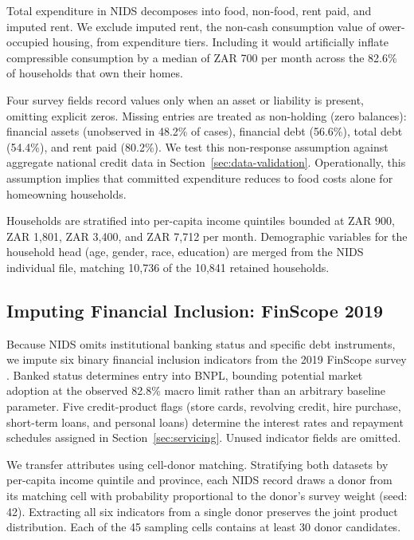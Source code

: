 Total expenditure in \ac{NIDS} decomposes into food, non-food, rent paid, and imputed rent.
We exclude imputed rent, the non-cash consumption value of ower-occupied housing, from expenditure tiers.
Including it would artificially inflate compressible consumption by a median of ZAR 700 per month across the 82.6\% of households that own their homes.

Four survey fields record values only when an asset or liability is present, omitting explicit zeros.
Missing entries are treated as non-holding (zero balances): financial assets (unobserved in 48.2\% of cases), financial debt (56.6\%), total debt (54.4\%), and rent paid (80.2\%).
We test this non-response assumption against aggregate national credit data in Section~\ref{sec:data-validation}.
Operationally, this assumption implies that committed expenditure reduces to food costs alone for homeowning households.

Households are stratified into per-capita income quintiles bounded at ZAR 900, ZAR 1{,}801, ZAR 3{,}400, and ZAR 7{,}712 per month.
Demographic variables for the household head (age, gender, race, education) are merged from the \ac{NIDS} individual file, matching 10{,}736 of the 10{,}841 retained households.

\subsection{Imputing Financial Inclusion: FinScope 2019}
\label{sec:match}

Because \ac{NIDS} omits institutional banking status and specific debt instruments, we impute six binary financial inclusion indicators from the 2019 \ac{FinScope} survey \cite{finscope2019}.
Banked status determines entry into \ac{BNPL}, bounding potential market adoption at the observed 82.8\% macro limit rather than an arbitrary baseline parameter.
Five credit-product flags (store cards, revolving credit, hire purchase, short-term loans, and personal loans) determine the interest rates and repayment schedules assigned in Section~\ref{sec:servicing}.
Unused indicator fields are omitted.

We transfer attributes using cell-donor matching.
Stratifying both datasets by per-capita income quintile and province, each \ac{NIDS} record draws a donor from its matching cell with probability proportional to the donor's survey weight (seed: 42).
Extracting all six indicators from a single donor preserves the joint product distribution.
Each of the 45 sampling cells contains at least 30 donor candidates.

